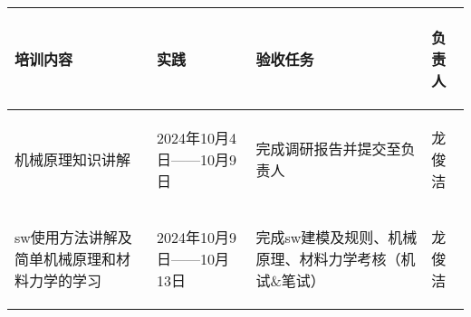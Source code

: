 
\begin{longtable}{ p{1.5cm} | p{3cm} | p{6cm} | p{4.3cm} |}

    \hline

    \endfoot
    
    \rowcolor{tabhdcolor}

        \begin{center}
            培训内容
        \end{center} &
        \begin{center}
            实践
        \end{center} &
        \begin{center}
            验收任务
        \end{center} &
        \begin{center}
            负责人
        \end{center}\\

    \hline

    \endhead

        \begin{center}
            机械原理知识讲解
        \end{center} &
        \begin{center}
            2024年10月4日——10月9日
        \end{center} &
        \begin{center}
            完成调研报告并提交至负责人
        \end{center} &
        \begin{center}
            龙俊洁
        \end{center}\\
        
    \hline
        \begin{center}
            sw使用方法讲解及简单机械原理和材料力学的学习
        \end{center}&
        \begin{center}
            2024年10月9日——10月13日
        \end{center}&
        \begin{center}
            完成sw建模及规则、机械原理、材料力学考核（机试\&笔试）
        \end{center}&
        \begin{center}
            龙俊洁
        \end{center}\\
        

\end{longtable}
